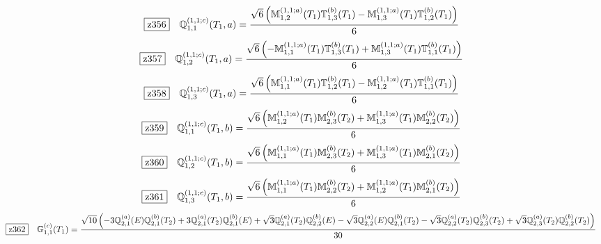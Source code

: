 \documentclass[fleqn,10pt,landscape]{jsarticle}
\begin{document}
\begin{dmath*}
\hspace*{3mm}\fbox{z356}\quad \mathbb{Q}_{1,1}^{(1,1;c)}(T_{1},a)=\frac{\sqrt{6} \left(\mathbb{M}_{1,2}^{(1,1;a)}(T_{1}) \mathbb{T}_{1,3}^{(b)}(T_{1}) - \mathbb{M}_{1,3}^{(1,1;a)}(T_{1}) \mathbb{T}_{1,2}^{(b)}(T_{1})\right)}{6}
\end{dmath*}
\begin{dmath*}
\hspace*{3mm}\fbox{z357}\quad \mathbb{Q}_{1,2}^{(1,1;c)}(T_{1},a)=\frac{\sqrt{6} \left(- \mathbb{M}_{1,1}^{(1,1;a)}(T_{1}) \mathbb{T}_{1,3}^{(b)}(T_{1}) + \mathbb{M}_{1,3}^{(1,1;a)}(T_{1}) \mathbb{T}_{1,1}^{(b)}(T_{1})\right)}{6}
\end{dmath*}
\begin{dmath*}
\hspace*{3mm}\fbox{z358}\quad \mathbb{Q}_{1,3}^{(1,1;c)}(T_{1},a)=\frac{\sqrt{6} \left(\mathbb{M}_{1,1}^{(1,1;a)}(T_{1}) \mathbb{T}_{1,2}^{(b)}(T_{1}) - \mathbb{M}_{1,2}^{(1,1;a)}(T_{1}) \mathbb{T}_{1,1}^{(b)}(T_{1})\right)}{6}
\end{dmath*}
\begin{dmath*}
\hspace*{3mm}\fbox{z359}\quad \mathbb{Q}_{1,1}^{(1,1;c)}(T_{1},b)=\frac{\sqrt{6} \left(\mathbb{M}_{1,2}^{(1,1;a)}(T_{1}) \mathbb{M}_{2,3}^{(b)}(T_{2}) + \mathbb{M}_{1,3}^{(1,1;a)}(T_{1}) \mathbb{M}_{2,2}^{(b)}(T_{2})\right)}{6}
\end{dmath*}
\begin{dmath*}
\hspace*{3mm}\fbox{z360}\quad \mathbb{Q}_{1,2}^{(1,1;c)}(T_{1},b)=\frac{\sqrt{6} \left(\mathbb{M}_{1,1}^{(1,1;a)}(T_{1}) \mathbb{M}_{2,3}^{(b)}(T_{2}) + \mathbb{M}_{1,3}^{(1,1;a)}(T_{1}) \mathbb{M}_{2,1}^{(b)}(T_{2})\right)}{6}
\end{dmath*}
\begin{dmath*}
\hspace*{3mm}\fbox{z361}\quad \mathbb{Q}_{1,3}^{(1,1;c)}(T_{1},b)=\frac{\sqrt{6} \left(\mathbb{M}_{1,1}^{(1,1;a)}(T_{1}) \mathbb{M}_{2,2}^{(b)}(T_{2}) + \mathbb{M}_{1,2}^{(1,1;a)}(T_{1}) \mathbb{M}_{2,1}^{(b)}(T_{2})\right)}{6}
\end{dmath*}
\begin{dmath*}
\hspace*{3mm}\fbox{z362}\quad \mathbb{G}_{1,1}^{(c)}(T_{1})=\frac{\sqrt{10} \left(- 3 \mathbb{Q}_{2,1}^{(a)}(E) \mathbb{Q}_{2,1}^{(b)}(T_{2}) + 3 \mathbb{Q}_{2,1}^{(a)}(T_{2}) \mathbb{Q}_{2,1}^{(b)}(E) + \sqrt{3} \mathbb{Q}_{2,1}^{(a)}(T_{2}) \mathbb{Q}_{2,2}^{(b)}(E) - \sqrt{3} \mathbb{Q}_{2,2}^{(a)}(E) \mathbb{Q}_{2,1}^{(b)}(T_{2}) - \sqrt{3} \mathbb{Q}_{2,2}^{(a)}(T_{2}) \mathbb{Q}_{2,3}^{(b)}(T_{2}) + \sqrt{3} \mathbb{Q}_{2,3}^{(a)}(T_{2}) \mathbb{Q}_{2,2}^{(b)}(T_{2})\right)}{30}
\end{dmath*}
\end{document}
